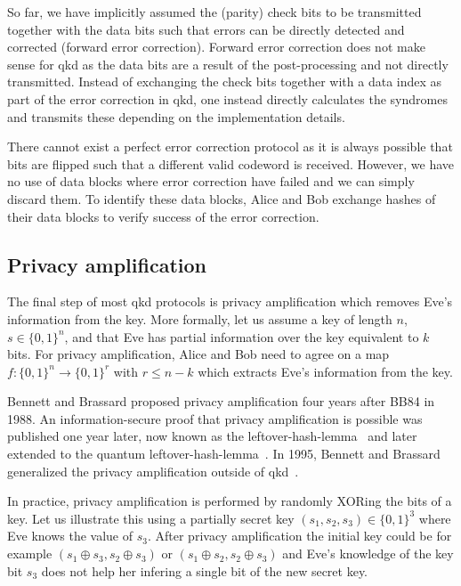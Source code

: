 So far, we have implicitly assumed the (parity) check bits to be transmitted together with the data bits such that errors can be directly detected and corrected (forward error correction).
Forward error correction does not make sense for \gls{qkd} as the data bits are a result of the post-processing and not directly transmitted.
Instead of exchanging the check bits together with a data index as part of the error correction in \gls{qkd}, one instead directly calculates the syndromes and transmits these depending on the implementation details.

There cannot exist a perfect error correction protocol as it is always possible that bits are flipped such that a different valid codeword is received.
However, we have no use of data blocks where error correction have failed and we can simply discard them.
To identify these data blocks, Alice and Bob exchange hashes of their data blocks to verify success of the error correction.

\FloatBarrier
\subsection{Privacy amplification}

The final step of most \gls{qkd} protocols is privacy amplification which removes Eve's information from the key.
More formally, let us assume a key of length $n$, $s\in\{0,1\}^n$, and that Eve has partial information over the key equivalent to $k$ bits.
For privacy amplification, Alice and Bob need to agree on a map $f\colon\{0,1\}^n\to\{0,1\}^r$ with $r\leq n-k$ which extracts Eve's information from the key.

Bennett and Brassard proposed privacy amplification four years after BB84 in 1988.
An information-secure proof that privacy amplification is possible was published one year later, now known as the leftover-hash-lemma~\cite{Impagliazzo1989} and later extended to the quantum leftover-hash-lemma~\cite{Renner2005}.
In 1995, Bennett and Brassard generalized the privacy amplification outside of \gls{qkd}~\cite{Bennett1995}.

In practice, privacy amplification is performed by randomly XORing the bits of a key.
Let us illustrate this using a partially secret key $(s_1,s_2,s_3)\in\{0,1\}^3$ where Eve knows the value of $s_3$.
After privacy amplification the initial key could be for example $(s_1\oplus s_3,s_2\oplus s_3)$ or $(s_1\oplus s_2,s_2\oplus s_3)$ and Eve's knowledge of the key bit $s_3$ does not help her infering a single bit of the new secret key.

